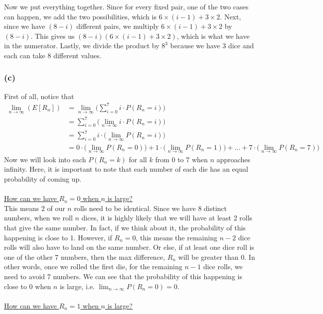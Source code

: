 \documentclass{article}
\begin{document}
Now we put everything together. Since for every fixed pair, one of the two cases can happen, we add the two possibilities, which is $6\times (i-1)+3\times 2$. 
Next, since we have $(8-i)$ different pairs, we multiply $6\times (i-1)+3\times 2$ by $(8-i)$. This gives us $(8-i)(6\times (i-1)+3\times 2)$, which is what we have in the numerator. Lastly, we divide the product by $8^3$ because we have 3 dice and each can take 8 different values. 


\subsubsection*{(c)}
First of all, notice that 
\begin{align*}
    \lim_{n\to\infty} (E[R_n])&=\lim_{n\to\infty}\bigg(\sum_{i=0}^7 i\cdot P(R_n=i)\bigg)\\
    &=\sum_{i=0}^7 \bigg(\lim_{n\to\infty} i\cdot P(R_n=i)\bigg)\\
    &=\sum_{i=0}^7 i\cdot \bigg(\lim_{n\to\infty} P(R_n=i)\bigg)\tag{since $i$ is a constant to the limit}\\
    &= 0\cdot \bigg(\lim_{n\to\infty} P(R_n=0)\bigg)+1\cdot\bigg(\lim_{n\to\infty} P(R_n=1)\bigg) +\dots+7\cdot \bigg(\lim_{n\to\infty} P(R_n=7)\bigg)
\end{align*}
Now we will look into each $P(R_n=k)$ for all $k$ from 0 to 7 when $n$ approaches infinity. Here, it is important to note that each number of each die has an equal probability of coming up. \\~\\
\underline{How can we have $R_n=0$ when $n$ is large?}\\
This means 2 of our $n$ rolls need to be identical. Since we have 8 distinct numbers, when we roll $n$ dices, it is highly likely that we will have at least 2 rolls that give the same number. In fact, if we think about it, the probability of this happening is close to 1. However, if $R_n=0$, this means the remaining $n-2$ dice rolls will also have to land on the same number. Or else, if at least one dice roll is one of the other 7 numbers, then the max difference, $R_n$ will be greater than 0. In other words, once we rolled the first die, for the remaining $n-1$ dice rolls, we need to avoid 7 numbers. We can see that the probability of this happening is close to 0 when $n$ is large, i.e. $\lim_{n\to\infty} P(R_n=0)=0$.\\~\\
\underline{How can we have $R_n=1$ when $n$ is large?}\\
\end{document}
